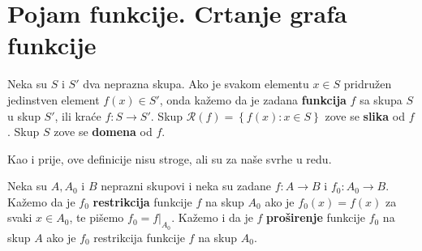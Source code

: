 \section{Pojam funkcije. Crtanje grafa funkcije}

\begin{definition}
Neka su \(S\) i \(S'\) dva neprazna skupa. Ako je svakom elementu \(x\in S\) pridružen jedinstven element \(f(x)\in S'\), onda kažemo da je zadana \textbf{funkcija} \(f\) sa skupa \(S\) u skup \(S'\), ili kraće \(f : S\to S'\). Skup \(\mathcal{R}(f)=\left\{ f(x) : x\in S\right\}\) zove se \textbf{slika} od \(f\). Skup \(S\) zove se \textbf{domena} od \(f\).
\end{definition}

Kao i prije, ove definicije nisu stroge, ali su za naše svrhe u redu.

\begin{definition}
Neka su \(A, A_0\) i \(B\) neprazni skupovi i neka su zadane \(f : A\to B\) i \(f_0 : A_0\to B\). Kažemo da je \(f_0\) \textbf{restrikcija} funkcije \(f\) na skup \(A_0\) ako je \(f_0(x)=f(x)\) za svaki \(x\in A_0\), te pišemo \(f_0=f|_{A_0}\). Kažemo i da je \(f\) \textbf{proširenje} funkcije \(f_0\) na skup \(A\) ako je \(f_0\) restrikcija funkcije \(f\) na skup \(A_0\). 
\end{definition}


